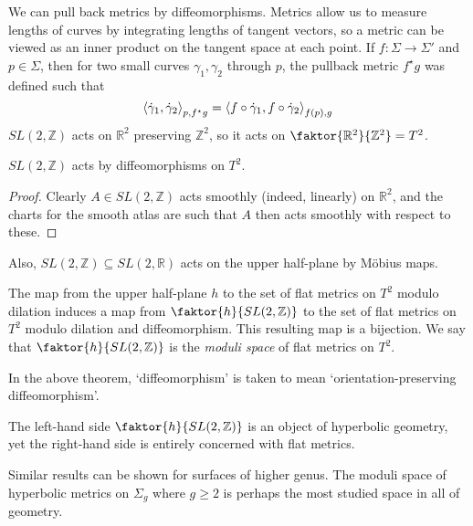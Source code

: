 We can pull back metrics by diffeomorphisms.
Metrics allow us to measure lengths of curves by integrating lengths of tangent vectors, so a metric can be viewed as an inner product on the tangent space at each point.
If \( f \colon \Sigma \to \Sigma' \) and \( p \in \Sigma \), then for two small curves \( \gamma_1, \gamma_2 \) through \( p \), the pullback metric \( f^\star g \) was defined such that
\[ \left\langle{\dot \gamma_1, \dot \gamma_2}\right\rangle_{p, f^\star g} = \left\langle{f \circ \dot \gamma_1, f \circ \dot \gamma_2}\right\rangle_{f(p), g} \]
\( SL(2,\mathbb Z) \) acts on \( \mathbb R^2 \) preserving \( \mathbb Z^2 \), so it acts on \( \faktor{\mathbb R^2}{\mathbb Z^2} = T^2 \).
\begin{lemma}
	\( SL(2,\mathbb Z) \) acts by diffeomorphisms on \( T^2 \).
\end{lemma}
\begin{proof}
	Clearly \( A \in SL(2,\mathbb Z) \) acts smoothly (indeed, linearly) on \( \mathbb R^2 \), and the charts for the smooth atlas are such that \( A \) then acts smoothly with respect to these.
\end{proof}
Also, \( SL(2,\mathbb Z) \subseteq SL(2,\mathbb R) \) acts on the upper half-plane by M\"obius maps.
\begin{theorem}
	The map from the upper half-plane \( h \) to the set of flat metrics on \( T^2 \) modulo dilation induces a map from \( \faktor{h}{SL(2,\mathbb Z)} \) to the set of flat metrics on \( T^2 \) modulo dilation and diffeomorphism.
	This resulting map is a bijection.
	We say that \( \faktor{h}{SL(2,\mathbb Z)} \) is the \textit{moduli space} of flat metrics on \( T^2 \).
\end{theorem}
In the above theorem, `diffeomorphism' is taken to mean `orientation-preserving diffeomorphism'.
\begin{remark}
	The left-hand side \( \faktor{h}{SL(2,\mathbb Z)} \) is an object of hyperbolic geometry, yet the right-hand side is entirely concerned with flat metrics.
	
	Similar results can be shown for surfaces of higher genus.
	The moduli space of hyperbolic metrics on \( \Sigma_g \) where \( g \geq 2 \) is perhaps the most studied space in all of geometry.
\end{remark}

